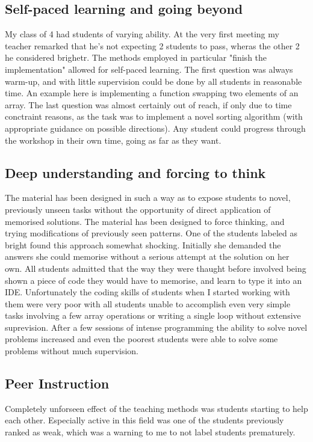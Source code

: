 \documentclass[12pt]{article}
\begin{document}
\subsection{Self-paced learning and going beyond}
My class of 4 had students of varying ability. At the very first meeting my teacher remarked that he's not expecting 2 students to pass, wheras the other 2 he considered brighetr. The methods employed in particular "finish the implementation" allowed for self-paced learning. The first question was always warm-up, and with little supervision could be done by all students in reasonable time. An example here is implementing a function swapping two elements of an array. The last question was almost certainly out of reach, if only due to time conctraint reasons, as the task was to implement a novel sorting algorithm (with appropriate guidance on possible directions). Any student could progress through the workshop in their own time, going as far as they want.

\subsection{Deep understanding and forcing to think}
The material has been designed in such a way as to expose students to novel, previously unseen tasks without the opportunity of direct application of memorised solutions. The material has been designed to force thinking, and trying modifications of previously seen patterns. One of the students labeled as bright found this approach somewhat shocking. Initially she demanded the answers she could memorise without a serious attempt at the solution on her own. All students admitted that the way they were thaught before involved being shown a piece of code they would have to memorise, and learn to type it into an IDE. Unfortunately the coding skills of students when I started working with them were very poor with all students unable to accomplish even very simple tasks involving a few array operations or writing a single loop without extensive suprevision. After a few sessions of intense programming the ability to solve novel problems increased and even the poorest students were able to solve some problems without much supervision.

\subsection{Peer Instruction}
Completely unforseen effect of the teaching methods was students starting to help each other. Especially active in this field was one of the students previously ranked as weak, which was a warning to me to not label students prematurely.
\end{document}

